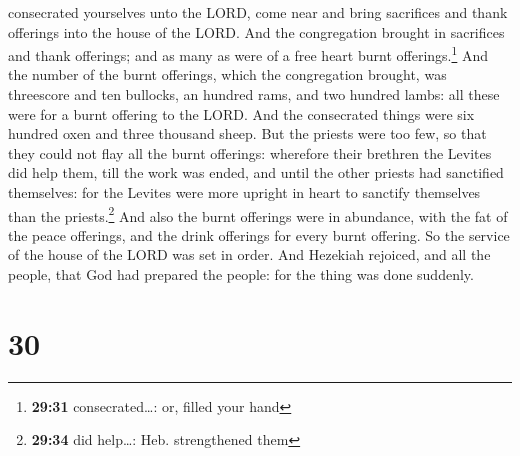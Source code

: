 consecrated yourselves unto the LORD, come near and bring sacrifices and
thank offerings into the house of the LORD. And the congregation brought
in sacrifices and thank offerings; and as many as were of a free heart
burnt offerings.\footnote{\textbf{29:31} consecrated\ldots: or, filled
  your hand}  And the number of the burnt offerings,
which the congregation brought, was threescore and ten bullocks, an
hundred rams, and two hundred lambs: all these were for a burnt offering
to the LORD.  And the consecrated things were six hundred
oxen and three thousand sheep.  But the priests were too
few, so that they could not flay all the burnt offerings: wherefore
their brethren the Levites did help them, till the work was ended, and
until the other priests had sanctified themselves: for the Levites were
more upright in heart to sanctify themselves than the
priests.\footnote{\textbf{29:34} did help\ldots: Heb. strengthened them}
 And also the burnt offerings were in abundance, with the
fat of the peace offerings, and the drink offerings for every burnt
offering. So the service of the house of the LORD was set in order.
 And Hezekiah rejoiced, and all the people, that God had
prepared the people: for the thing was done suddenly.

\hypertarget{section-29}{%
\section{30}\label{section-29}}

